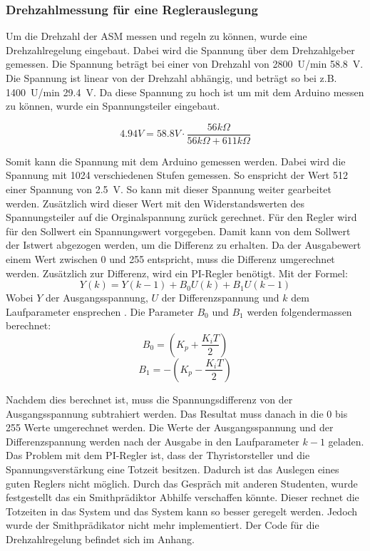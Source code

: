\subsubsection{Drehzahlmessung für eine Reglerauslegung}
Um die Drehzahl der ASM messen und regeln zu können, wurde eine Drehzahlregelung eingebaut. Dabei wird die Spannung über dem Drehzahlgeber gemessen. Die Spannung beträgt bei einer von Drehzahl von \SI{2800}{U/min} \SI{58.8}{V}. Die Spannung ist linear von der Drehzahl abhängig, und beträgt so bei z.B. \SI{1400}{U/min} \SI{29.4}{V}. Da diese Spannung zu hoch ist um mit dem Arduino messen zu können, wurde ein Spannungsteiler eingebaut. 

\begin{equation}
4.94 V = 58.8 V \cdot \frac{56k\Omega}{56k\Omega + 611k\Omega}
\end{equation}

Somit kann die Spannung mit dem Arduino gemessen werden. Dabei wird die Spannung mit 1024 verschiedenen Stufen gemessen. So enspricht der Wert 512 einer Spannung von \SI{2.5}{V}.
 So kann mit dieser Spannung weiter gearbeitet werden. Zusätzlich wird dieser Wert mit den Widerstandswerten des Spannungsteiler auf die Orginalspannung zurück gerechnet. Für den Regler wird für den Sollwert ein Spannungswert vorgegeben. Damit kann von dem Sollwert der Istwert abgezogen werden, um die Differenz zu erhalten. Da der Ausgabewert einem Wert zwischen 0 und 255 entspricht, muss die Differenz umgerechnet werden. Zusätzlich zur Differenz, wird ein PI-Regler benötigt. 
Mit der Formel: \cite{Quelle_Marco} 
\begin{equation}
Y(k) = Y(k-1)+ B_0U(k)+B_1U(k-1)
\end{equation}
Wobei $Y$ der Ausgangsspannung, $U$ der Differenzspannung und $k$ dem Laufparameter ensprechen \cite{PI_Regler}. Die Parameter $B_0$ und $B_1$ werden folgendermassen berechnet:
\begin{equation}\label{eq:B0}
B_0 = \left(K_p + \frac{K_iT}{2}\right) 
\end{equation}
\begin{equation}\label{eq:B1}
B_1 = -\left(K_p - \frac{K_iT}{2}\right) 
\end{equation}

Nachdem dies berechnet ist, muss die Spannungsdifferenz von der Ausgangsspannung subtrahiert werden. Das Resultat muss danach in die 0 bis 255 Werte umgerechnet werden. Die Werte der Ausgangsspannung und der Differenzspannung werden nach der Ausgabe in den Laufparameter $k-1$ geladen. Das Problem mit dem PI-Regler ist, dass der Thyristorsteller und die Spannungsverstärkung eine Totzeit besitzen. Dadurch ist das Auslegen eines guten Reglers nicht möglich. Durch das Gespräch mit anderen Studenten, wurde festgestellt das ein Smithprädiktor \cite{Regelungstechnik_Buch} Abhilfe verschaffen könnte. Dieser rechnet die Totzeiten in das System und das System kann so besser geregelt werden. Jedoch wurde der Smithprädikator nicht mehr implementiert. Der Code für die Drehzahlregelung befindet sich im Anhang. 

